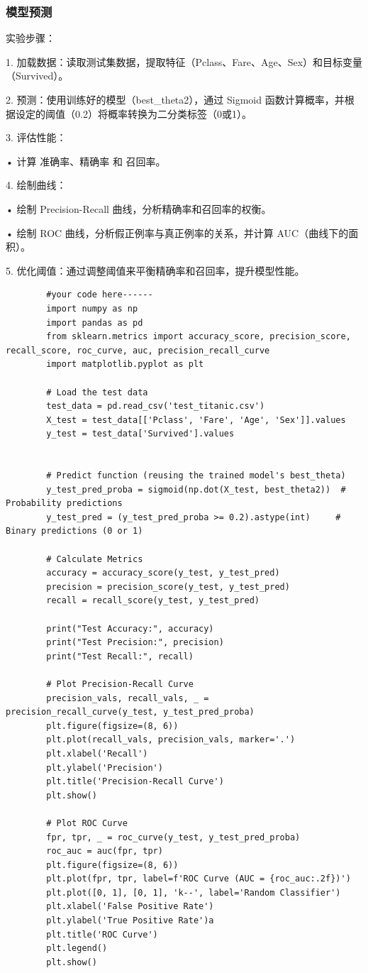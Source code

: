 \documentclass[12pt,a4paper,oneside]{article}
\begin{document}
    \subsubsection{模型预测}实验步骤：

    1.	加载数据：读取测试集数据，提取特征（Pclass、Fare、Age、Sex）和目标变量（Survived）。
	
    2.	预测：使用训练好的模型（best\_theta2），通过 Sigmoid 函数计算概率，并根据设定的阈值（0.2）将概率转换为二分类标签（0或1）。
	
    3.	评估性能：
	
    •	计算 准确率、精确率 和 召回率。
	
    4.	绘制曲线：
	
    •	绘制 Precision-Recall 曲线，分析精确率和召回率的权衡。
	
    •	绘制 ROC 曲线，分析假正例率与真正例率的关系，并计算 AUC（曲线下的面积）。
	
    5.	优化阈值：通过调整阈值来平衡精确率和召回率，提升模型性能。

    \begin{lstlisting}
        #your code here------
        import numpy as np
        import pandas as pd
        from sklearn.metrics import accuracy_score, precision_score, recall_score, roc_curve, auc, precision_recall_curve
        import matplotlib.pyplot as plt
        
        # Load the test data
        test_data = pd.read_csv('test_titanic.csv')
        X_test = test_data[['Pclass', 'Fare', 'Age', 'Sex']].values
        y_test = test_data['Survived'].values
        
        
        # Predict function (reusing the trained model's best_theta)
        y_test_pred_proba = sigmoid(np.dot(X_test, best_theta2))  # Probability predictions
        y_test_pred = (y_test_pred_proba >= 0.2).astype(int)     # Binary predictions (0 or 1)
        
        # Calculate Metrics
        accuracy = accuracy_score(y_test, y_test_pred)
        precision = precision_score(y_test, y_test_pred)
        recall = recall_score(y_test, y_test_pred)
        
        print("Test Accuracy:", accuracy)
        print("Test Precision:", precision)
        print("Test Recall:", recall)
        
        # Plot Precision-Recall Curve
        precision_vals, recall_vals, _ = precision_recall_curve(y_test, y_test_pred_proba)
        plt.figure(figsize=(8, 6))
        plt.plot(recall_vals, precision_vals, marker='.')
        plt.xlabel('Recall')
        plt.ylabel('Precision')
        plt.title('Precision-Recall Curve')
        plt.show()
        
        # Plot ROC Curve
        fpr, tpr, _ = roc_curve(y_test, y_test_pred_proba)
        roc_auc = auc(fpr, tpr)
        plt.figure(figsize=(8, 6))
        plt.plot(fpr, tpr, label=f'ROC Curve (AUC = {roc_auc:.2f})')
        plt.plot([0, 1], [0, 1], 'k--', label='Random Classifier')
        plt.xlabel('False Positive Rate')
        plt.ylabel('True Positive Rate')a
        plt.title('ROC Curve')
        plt.legend()
        plt.show()
    \end{lstlisting}
\end{document}
